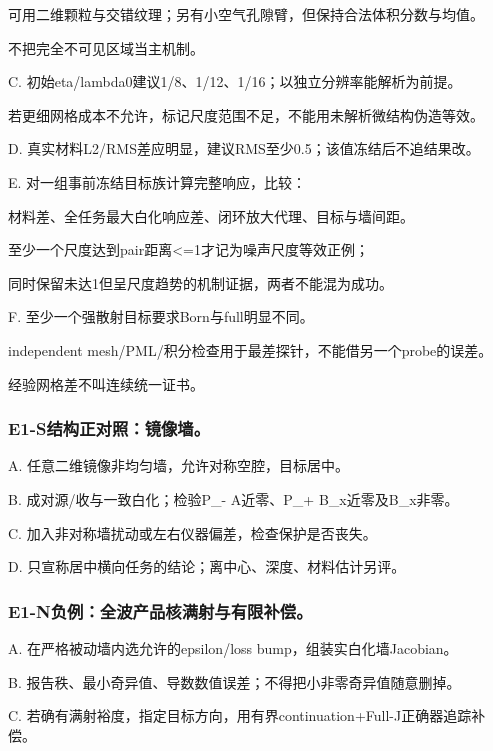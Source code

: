 \documentclass[
  10pt,
  a4paper,
]{article}
\begin{document}
可用二维颗粒与交错纹理；另有小空气孔隙臂，但保持合法体积分数与均值。

不把完全不可见区域当主机制。

C. 初始eta/lambda0建议1/8、1/12、1/16；以独立分辨率能解析为前提。

若更细网格成本不允许，标记尺度范围不足，不能用未解析微结构伪造等效。

D. 真实材料L2/RMS差应明显，建议RMS至少0.5；该值冻结后不追结果改。

E. 对一组事前冻结目标族计算完整响应，比较：

材料差、全任务最大白化响应差、闭环放大代理、目标与墙间距。

至少一个尺度达到pair距离\textless=1才记为噪声尺度等效正例；

同时保留未达1但呈尺度趋势的机制证据，两者不能混为成功。

F. 至少一个强散射目标要求Born与full明显不同。

independent mesh/PML/积分检查用于最差探针，不能借另一个probe的误差。

经验网格差不叫连续统一证书。

\hypertarget{e1-sux7ed3ux6784ux6b63ux5bf9ux7167ux955cux50cfux5899}{%
\subsubsection{E1-S结构正对照：镜像墙。}\label{e1-sux7ed3ux6784ux6b63ux5bf9ux7167ux955cux50cfux5899}}

A. 任意二维镜像非均匀墙，允许对称空腔，目标居中。

B. 成对源/收与一致白化；检验P\_- A近零、P\_+ B\_x近零及B\_x非零。

C. 加入非对称墙扰动或左右仪器偏差，检查保护是否丧失。

D. 只宣称居中横向任务的结论；离中心、深度、材料估计另评。

\hypertarget{e1-nux8d1fux4f8bux5168ux6ce2ux4ea7ux54c1ux6838ux6ee1ux5c04ux4e0eux6709ux9650ux8865ux507f}{%
\subsubsection{E1-N负例：全波产品核满射与有限补偿。}\label{e1-nux8d1fux4f8bux5168ux6ce2ux4ea7ux54c1ux6838ux6ee1ux5c04ux4e0eux6709ux9650ux8865ux507f}}

A. 在严格被动墙内选允许的epsilon/loss bump，组装实白化墙Jacobian。

B. 报告秩、最小奇异值、导数数值误差；不得把小非零奇异值随意删掉。

C.
若确有满射裕度，指定目标方向，用有界continuation+Full-J正确器追踪补偿。
\end{document}
